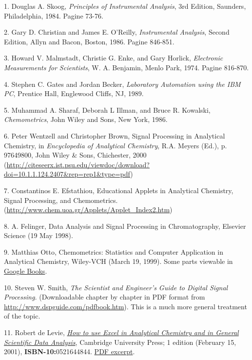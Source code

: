 1. Douglas A. Skoog, \textit{Principles of Instrumental Analysis}, 3rd Edition, Saunders, Philadelphia, 1984. Pagine 73-76.

2. Gary D. Christian and James E. O'Reilly, \textit{Instrumental Analysis}, Second Edition, Allyn and Bacon, Boston, 1986. Pagine 846-851.

3. Howard V. Malmstadt, Christie G. Enke, and Gary Horlick, \textit{Electronic Measurements for Scientists}, W. A. Benjamin, Menlo Park, 1974. Pagine 816-870.

4. Stephen C. Gates and Jordan Becker, \textit{Laboratory Automation using the IBM PC}, Prentice Hall, Englewood Cliffs, NJ, 1989.

5. Muhammad A. Sharaf, Deborah L Illman, and Bruce R. Kowalski, \textit{Chemometrics}, John Wiley and Sons, New York, 1986.

6. Peter Wentzell and Christopher Brown, Signal Processing in Analytical Chemistry, in \textit{Encyclopedia of Analytical Chemistry}, R.A. Meyers (Ed.), p. 9764\textendash{}9800, John Wiley \& Sons, Chichester, 2000 (\url{http://citeseerx.ist.psu.edu/viewdoc/download?doi=10.1.1.124.2407&rep=rep1&type=pdf})

7. Constantinos E. Efstathiou, Educational Applets in Analytical Chemistry, Signal Processing, and Chemometrics. (\url{http://www.chem.uoa.gr/Applets/Applet_Index2.htm})

8. A. Felinger, Data Analysis and Signal Processing in Chromatography, Elsevier Science (19 May 1998).

9. Matthias Otto, Chemometrics: Statistics and Computer Application in Analytical Chemistry, Wiley-VCH (March 19, 1999). Some parts viewable in \href{http://books.google.com/books?q=Matthias+Otto&btnG=Search+Books}{Google Books}.

10. Steven W. Smith, \textit{The Scientist and Engineer's Guide to Digital Signal Processing.} (Downloadable chapter by chapter in PDF format from \url{http://www.dspguide.com/pdfbook.htm}). This is a much more general treatment of the topic. 

11. Robert de Levie, \href{http://www.amazon.com/Analytical-Chemistry-General-Scientific-Analysis/dp/0521644844}{\textit{How to use Excel in Analytical Chemistry and in General Scientific Data Analysis}}, Cambridge University Press; 1 edition (February 15, 2001), \textbf{ISBN-10:}0521644844. \href{http://www.google.com/url?sa=t&ct=res&cd=1&url=http\%3A\%2F\%2Fassets.cambridge.org\%2F97805216\%2F42828\%2Fsample\%2F9780521642828ws.pdf&ei=4Ul\_SKuZH5C48ASVzJzICw&usg=AFQjCNHe4iEMybvyCaXjp0EZy9S81S81HA&sig2=1qzXPv8WgZ9ktQH\_v-XeFg}{PDF excerpt}.

